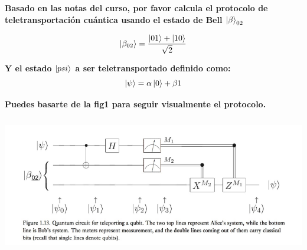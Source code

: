 \textbf{Basado en las notas del curso, por favor calcula el protocolo de
teletransportación cuántica usando el estado de Bell $\ket{\beta}_{02}$}\vspace{.2cm}

\[
    \ket{\beta_{02}} = \displaystyle\frac{\ket{01}+\ket{10}}{\sqrt{2}}  
\]

\textbf{Y el estado $\ket{psi}$ a ser teletransportado definido como:}
\[
    \ket{\psi} = \alpha \ket{0} + \beta{1}  
\]

\textbf{Puedes basarte de la fig1 para seguir visualmente el protocolo.}
 
\begin{center}
    \includegraphics[height=6cm]{src/Img/1.png}
\end{center}
